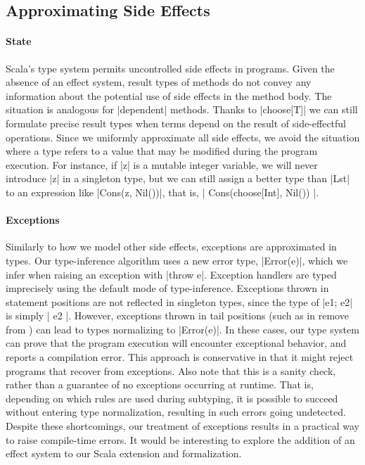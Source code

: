 \subsection{Approximating Side Effects}

\paragraph{State}

Scala's type system permits uncontrolled side effects in programs.
Given the absence of an effect system, result types of methods do not convey any information about the potential use of side effects in the method body.
The situation is analogous for |dependent| methods.
Thanks to |choose[T]| we can still formulate precise result types when terms depend on the result of side-effectful operations.
Since we uniformly approximate all side effects, we avoid the situation where a type refers to a value that may be modified during the program execution.
For instance, if |z| is a mutable integer variable, we will never introduce |z| in a singleton type, but we can still assign a better type than |Lst| to an expression like |Cons(z, Nil())|, that is, |{ Cons(choose[Int], Nil()) }|.

\paragraph{Exceptions}

Similarly to how we model other side effects, exceptions are approximated in types.
Our type-inference algorithm uses a new error type, |Error(e)|, which we infer when raising an exception with |throw e|.
Exception handlers are typed imprecisely using the default mode of type-inference.
Exceptions thrown in statement positions are not reflected in singleton types, since the type of |{e1; e2}| is simply |{ e2 }|.
However, exceptions thrown in tail positions (such as in remove from ) can lead to types normalizing to |Error(e)|.
In these cases, our type system can prove that the program execution will encounter exceptional behavior, and reports a compilation error.
This approach is conservative in that it might reject programs that recover from exceptions.
Also note that this is a sanity check, rather than a guarantee of no exceptions occurring at runtime.
That is, depending on which rules are used during subtyping, it is possible to succeed without entering type normalization, resulting in such errors going undetected.
Despite these shortcomings, our treatment of exceptions results in a practical way to raise compile-time errors.
It would be interesting to explore the addition of an effect system to our Scala extension and formalization.

